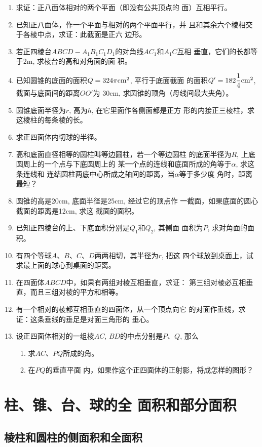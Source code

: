 \begin{enumerate}
\item 求证：正八面体相对的两个平面（即没有公共顶点的
面）互相平行。
\item 已知正八面体，作一个平面与相对的两个平面平行，并
且和其余六个棱相交于各棱中点，求证：此截面是正六
边形。
\item 若正四棱台$ABCD-A_1B_1C_1D_1$的对角线$AC_1$和$A_1C$互相
垂直，它们的长都等于2m, 求棱台的高和对角面的面
积。
\item 已知圆锥的底面的面积$Q=324\pi{\rm cm^2}$, 平行于底面截面
的面积$Q'=182\frac{1}{4}{\rm cm^2}$, 截面与底面间的距离$OO'$为
30cm, 求圆锥的顶角（母线间最大夹角）。
\item 圆锥底面半径为$r$, 高为$h$, 在它里面作各侧面都是正方
形的内接正三棱柱，求这棱柱的每条棱的长。
\item 求正四面体内切球的半径。
\item 高和底面直径相等的圆柱叫等边圆柱，若一个等边圆柱
的底面半径为$R$, 上底圆周上的一个点与下底圆周上的
某一个点的连线和底面所成的角等于$\alpha$, 求这条连线和
连结圆柱两底中心所成之轴间的距离，当$\alpha$等于多少度
角时，距离最短？
\item 圆锥的高是20cm, 底面半径是25cm, 经过它的顶点作
一截面，如果底面的圆心截面的距离是12cm, 求这
截面的面积。
\item 已知正四棱台的上、下底面积分别是$Q_1$和$Q_2$, 其侧面
面积为$P$, 求对角面的面积。
\item 有四个等球$A$、$B$、$C$、$D$两两相切，其半径为$r$, 把这
四个球放到桌面上，试求最上面的球心到桌面的距离。
\item 在四面体$ABCD$中，如果有两组对棱互相垂直，求证：
第三组对棱必互相垂直，而且三组对棱的平方和相等。
\item 有一个相对的棱都互相垂直的四面体，从一个顶点向它
的对面作垂线，求证：这条垂线的垂足是对面三角形的
垂心。
\item 设正四面体相对的一组棱$AC$, $BD$的中点分别是$P$、$Q$,
那么
\begin{enumerate}
\item 求$AC$、$PQ$所成的角。    
\item 在$PQ$的垂直平面
内，如果作这个正四面体的正射影，将成怎样的图形？
\end{enumerate}
\end{enumerate}

\section{柱、锥、台、球的全
面积和部分面积}
\subsection{棱柱和圆柱的侧面积和全面积}

